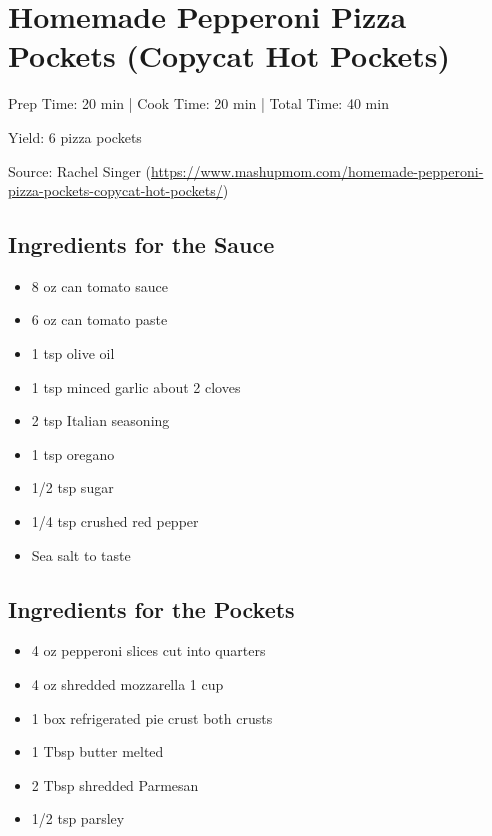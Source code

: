 \section{Homemade Pepperoni Pizza Pockets (Copycat Hot Pockets)}

\begin{center}
Prep Time: 20 min |
Cook Time: 20 min |
Total Time: 40 min

\noindent Yield: 6 pizza pockets

\vspace{1em}

    Source: Rachel Singer (\url{https://www.mashupmom.com/homemade-pepperoni-pizza-pockets-copycat-hot-pockets/})
\end{center}

\subsection{Ingredients for the Sauce}
\begin{multicols}{2}
\begin{itemize}
  \item 8 oz can tomato sauce
  \item 6 oz can tomato paste
  \item 1 tsp olive oil
  \item 1 tsp minced garlic about 2 cloves
  \item 2 tsp Italian seasoning
  \item 1 tsp oregano
  \item 1/2 tsp sugar
  \item 1/4 tsp crushed red pepper
  \item Sea salt to taste
\end{itemize}
\end{multicols}

\subsection{Ingredients for the Pockets}
\begin{multicols}{2}
\begin{itemize}
  \item 4 oz pepperoni slices cut into quarters
  \item 4 oz shredded mozzarella 1 cup
  \item 1 box refrigerated pie crust both crusts
  \item 1 Tbsp butter melted
  \item 2 Tbsp shredded Parmesan
  \item 1/2 tsp parsley
\end{itemize}
\end{multicols}

